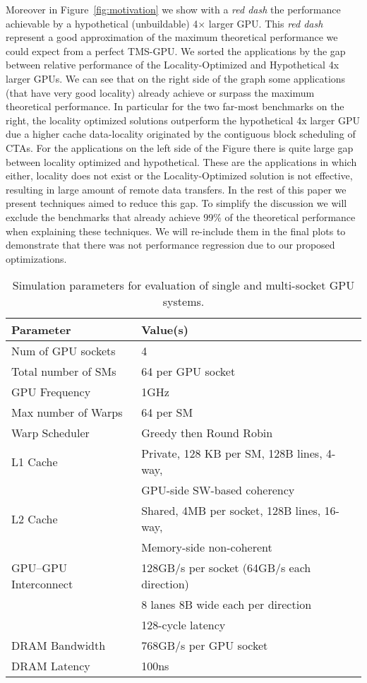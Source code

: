 Moreover in Figure~\ref{fig:motivation} we show with a \emph{red dash} the performance 
achievable by a hypothetical (unbuildable) 4$\times$ larger GPU. This \emph{red dash} 
represent a good approximation of the maximum theoretical performance we 
could expect from a perfect TMS-GPU. We sorted the applications by the 
gap between relative performance of the Locality-Optimized and 
Hypothetical 4x larger GPUs. We can see that on the right side of the graph 
some applications (that have very good locality) already 
achieve or surpass the maximum theoretical performance. In particular for the 
two far-most benchmarks on the right, the locality optimized solutions outperform 
the hypothetical 4x larger GPU due a higher cache data-locality originated by 
the contiguous block scheduling of CTAs. For the applications on the left 
side of the Figure there is quite large gap between locality optimized and 
hypothetical. These are the applications in which either, locality does not 
exist or the Locality-Optimized solution is not effective, 
resulting in large amount of remote data transfers. In the rest of this paper we 
present techniques aimed to reduce this gap. To simplify the discussion we 
will exclude the benchmarks that already achieve 99\% of the theoretical 
performance when explaining these techniques. We will re-include them in the 
final plots to demonstrate that there was not performance regression due to 
our proposed optimizations.


\begin{table}[tp]
\begin{small}
\centering
\begin{tabular}{ll}
\toprule
\textbf{Parameter} & \textbf{Value(s)} \\
\toprule
Num of GPU sockets & 4 \\
\midrule
Total number of SMs & 64 per GPU socket \\
\midrule
GPU Frequency & 1GHz \\
\midrule
Max number of Warps & 64 per SM \\
\midrule
Warp Scheduler & Greedy then Round Robin \\
\midrule
L1 Cache & Private, 128 KB per SM, 128B lines, 4-way, \\ 
& GPU-side SW-based coherency \\
\midrule
L2 Cache & Shared, 4MB per socket, 128B lines, 16-way, \\ 
& Memory-side non-coherent\\
\midrule
GPU--GPU Interconnect & 128GB/s per socket (64GB/s each direction) \\
& 8 lanes 8B wide each per direction \\
&128-cycle latency \\
\midrule
DRAM Bandwidth & 768GB/s per GPU socket\\
\midrule
DRAM Latency & 100ns \\
\toprule
\end{tabular}
\caption{Simulation parameters for evaluation of single and multi-socket GPU 
systems.}
\label{tab:setup}
\end{small}
\end{table} 
 
